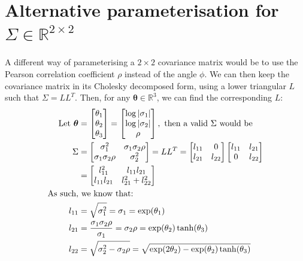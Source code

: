 \documentclass[a4paper, 12pt]{report}
\begin{document}
\section{Alternative parameterisation for $\Sigma \in \mathbb{R}^{2\times 2}$}
\label{sec:pearson}
A different way of parameterising a $2\times 2$ covariance matrix  would be to use the Pearson correlation coefficient $\rho$ instead of the angle $\phi$. 
We can then keep the covariance matrix in its Cholesky decomposed form, using a lower triangular $L$ such that $\Sigma=LL^T$. Then, for any $\boldsymbol{\theta}\in\mathbb{R}^3$, we can find the corresponding $L$:
\begin{align}
\textrm{Let }\boldsymbol{\theta}&=\begin{bmatrix}
	\theta_1\\
	\theta_2\\
	\theta_3\\
\end{bmatrix}=\begin{bmatrix}
	\log|\sigma_1| \\
	\log|\sigma_2|\\
	\rho\\
\end{bmatrix}, \textrm{ then a valid $\Sigma$ would be} \\
	\Sigma &= \begin{bmatrix}
 \sigma_1^2 & \sigma_1\sigma_2\rho \\
  \sigma_1\sigma_2\rho & \sigma_2^2 \\
\end{bmatrix}
= LL^T = \begin{bmatrix}
 l_{11} & 0 \\
  l_{21} & l_{22} \\
\end{bmatrix}\begin{bmatrix}
 l_{11} & l_{21} \\
  0 & l_{22} \\
\end{bmatrix}\\
&=\begin{bmatrix}
 l_{11}^2 & l_{11}l_{21} \\
  l_{11}l_{21} & l_{21}^2 + l_{22}^2 \\
\end{bmatrix}\hspace{0.5cm}\\
\textrm{As such,}&\textrm{ we know that:}\nonumber\\
	l_{11} &= \sqrt{\sigma_1^2} =\sigma_1=\exp(\theta_1)\\
	l_{21} &= \frac{\sigma_1\sigma_2\rho}{\sigma_1}=\sigma_2\rho=\exp(\theta_2)\tanh(\theta_3) \\
	l_{22} &= \sqrt{\sigma_2^2 - \sigma_2\rho} = \sqrt{\exp(2\theta_2)-\exp(\theta_2)\tanh(\theta_3)}
\end{align}
\end{document}
